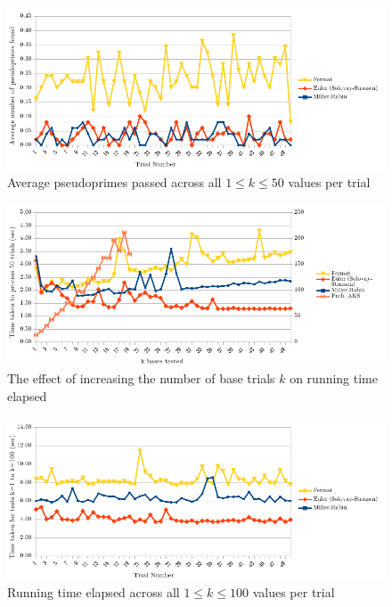 \documentclass{article}
\begin{document}
\FloatBarrier
\begin{figure}[h!]
\caption{Average pseudoprimes passed across all $1 \leq k \leq 50$ values per trial}
\label{fig:pprimes_v_trial}
\centering
\includegraphics[width=\textwidth]{pprimes_v_trial}
\end{figure}
\FloatBarrier

\FloatBarrier
\begin{figure}[h!]
\caption{The effect of increasing the number of base trials $k$ on running time elapsed}
\label{fig:time_v_bases}
\centering
\includegraphics[width=\textwidth]{time_v_bases}
\end{figure}
\FloatBarrier

\FloatBarrier
\begin{figure}[h!]
\caption{Running time elapsed across all $1 \leq k \leq 100$ values per trial}
\label{fig:time_v_trial}
\centering
\includegraphics[width=\textwidth]{time_v_trial}
\end{figure}
\end{document}
